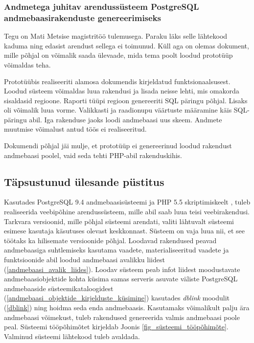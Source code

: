 \documentclass[a4paper,12pt]{article} %
\begin{document}
\subsubsection{Andmetega juhitav arendussüsteem PostgreSQL andmebaasirakenduste genereerimiseks}
Tegu on Mati Metsise magistritöö \cite{pgdb} tulemusega. Paraku läks selle lähtekood kaduma ning edasist arendust sellega ei toimunud. Küll aga on olemas dokument, mille põhjal on võimalik saada ülevaade, mida tema poolt loodud prototüüp võimaldas teha.\par
Prototüübis realiseeriti alamosa dokumendis kirjeldatud funktsionaalsusest. Loodud süsteem võimaldas luua rakendusi ja lisada neisse lehti, mis omakorda sisaldasid regioone. Raporti tüüpi regioon genereeriti SQL päringu põhjal. Lisaks oli võimalik luua vorme. Valikkasti ja raadionupu väärtuste määramine käis SQL-päringu abil. Iga rakenduse jaoks loodi andmebaasi uus skeem. Andmete muutmise võimalust antud töös ei realiseeritud.\par
Dokumendi põhjal jäi mulje, et prototüüp ei genereerinud loodud rakendust andmebaasi poolel, vaid seda tehti PHP-abil rakenduskihis.
\subsection{Täpsustunud ülesande püstitus}
Kasutades PostgreSQL 9.4 andmebaasisüsteemi \cite{PostgreSQL} ja PHP 5.5 skriptimiskeelt \cite{PHP}, tuleb realiseerida veebipõhine arendussüsteem, mille abil saab luua teisi veebirakendusi. Tarkvara versioonid, mille põhjal süsteemi arendati, valiti lähtuvalt süsteemi esimese kasutaja käsutuses olevast keskkonnast. Süsteem on vaja luua nii, et see töötaks ka hilisemate versioonide põhjal. Loodavad rakendused peavad andmebaasiga suhtlemiseks kasutama vaadete, materialiseeritud vaadete ja funktsioonide abil loodud andmebaasi avalikku liidest (\ref{andmebaasi_avalik_liides}). Loodav süsteem peab infot liidest moodustavate andmebaasiobjektide kohta küsima samas serveris asuvate väliste PostgreSQL andmebaaside süsteemikataloogidest (\ref{andmebaasi_objektide_kirjelduste_küsimine}) kasutades \textit{dblink} moodulit (\ref{dblink}) ning hoidma seda enda andmebaasis. Kasutamaks võimalikult palju ära andmebaasi võimekust, tuleb rakendused genereerida valmis andmebaasi poole peal. Süsteemi tööpõhimõtet kirjeldab Joonis \ref{fig_süsteemi_tööpõhimõte}. Valminud süsteemi lähtekood tuleb avaldada.
\end{document}
